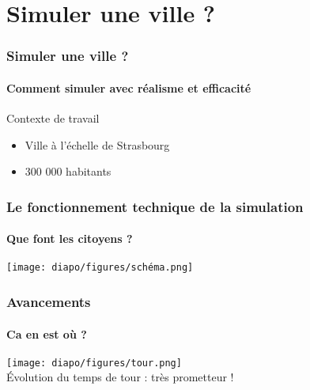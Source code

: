 \section[Back-end]{Simuler une ville ?}


\begin{frame}
	\frametitle{Simuler une ville ?}
	\framesubtitle{Comment simuler avec réalisme et efficacité}

	\begin{alertblock}{Contexte de travail}
	    \begin{itemize}
	        \item Ville à l'échelle de Strasbourg
	        \item 300 000 habitants
        \end{itemize}  
	\end{alertblock}
    

\end{frame}


\begin{frame}
    \frametitle{Le fonctionnement technique de la simulation}
    \framesubtitle{Que font les citoyens ?}
    
    \begin{center}
        \texttt{[image: diapo/figures/schéma.png]}
    \end{center}

\end{frame}


\begin{frame}

    \frametitle{Avancements}
    \framesubtitle{Ca en est où ?}
    
    \begin{center}
        \texttt{[image: diapo/figures/tour.png]}\\
        Évolution du temps de tour : très prometteur !
    \end{center}
\end{frame}